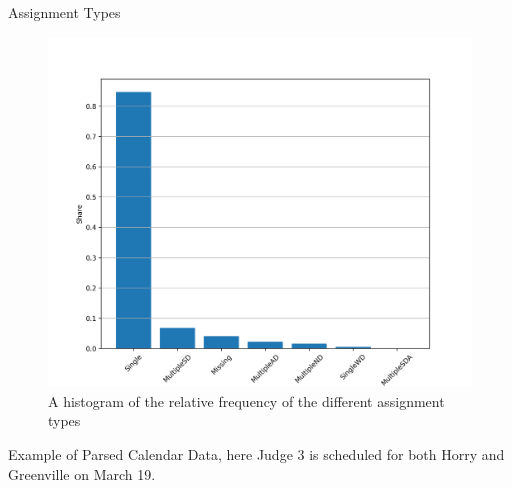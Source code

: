 \documentclass[11pt, oneside]{article}   	%
\theoremstyle{ModifiedStyle}
\begin{document}
      \begin{table}[H]
        \centering
        \caption{Assignment Types}
        \label{tab-assignments}
        
      \end{table}

			\begin{figure}[H]
				\centering
				\includegraphics[scale=0.65]{../../output/figures/Description/assignment_type_hist.png}
				\caption{A histogram of the relative frequency of the different assignment types}
				\label{assignment_type_hist}
			\end{figure}

      \begin{table}[H]
        \centering
        \caption{Example of Parsed Calendar Data, here Judge 3 is scheduled for both Horry and Greenville on March 19.}
        \label{tab-calendar-example}
        
      \end{table}
\end{document}
